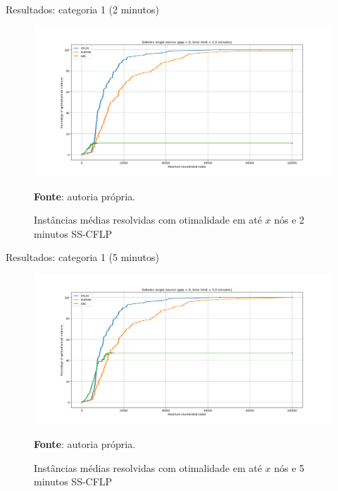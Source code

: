 \documentclass[aspectratio=169]{beamer}
\begin{document}
	
	\begin{frame}{Resultados: categoria 1 (2 minutos)} %
		
		\begin{figure}[H]
			\begin{center}
				\caption{Instâncias médias resolvidas com otimalidade em até $x$ nós e 2 minutos SS-CFLP \cite{Sobolev}}
				
				\includegraphics[height=0.6\textheight]{res/Sobolev SS 120 - Optimal x Nodes.png}
				\label{Opt:n:SS:Sobolev:120}
				
				\textbf{Fonte}: autoria própria.
			\end{center}
		\end{figure}
		
	\end{frame}

	\begin{frame}{Resultados: categoria 1 (5 minutos)} %
		
		\begin{figure}[H]
			\begin{center}
				\caption{Instâncias médias resolvidas com otimalidade em até $x$ nós e 5 minutos SS-CFLP \cite{Sobolev}}
				
				\includegraphics[height=0.6\textheight]{res/Sobolev SS 300 - Optimal x Nodes.png}
				\label{Opt:n:SS:Sobolev:300}
				
				\textbf{Fonte}: autoria própria.
			\end{center}
		\end{figure}
		
	\end{frame}
	
\end{document}
